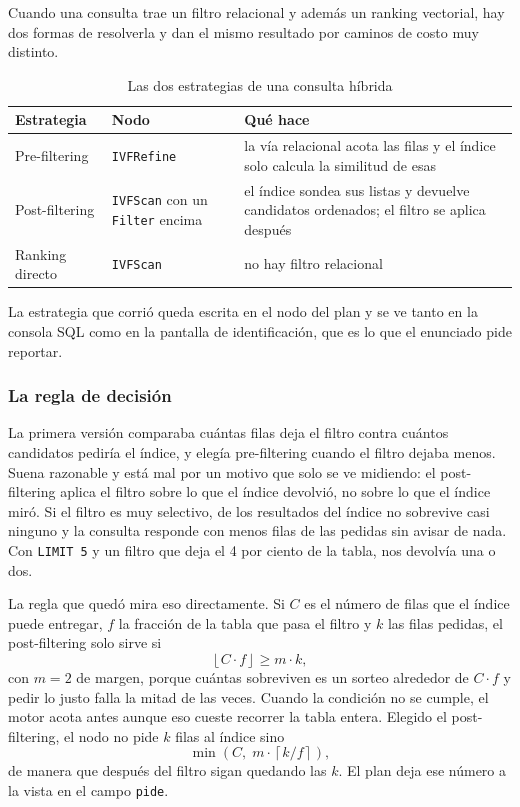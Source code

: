 Cuando una consulta trae un filtro relacional y además un ranking vectorial, hay
dos formas de resolverla y dan el mismo resultado por caminos de costo muy
distinto.

\begin{table}[H]
\centering
\caption{Las dos estrategias de una consulta híbrida}
\begin{tabularx}{\textwidth}{@{}llX@{}}
\toprule
\textbf{Estrategia} & \textbf{Nodo} & \textbf{Qué hace} \\
\midrule
Pre-filtering & \texttt{IVFRefine} & la vía relacional acota las filas y el índice
solo calcula la similitud de esas \\
Post-filtering & \texttt{IVFScan} con un \texttt{Filter} encima & el índice sondea
sus listas y devuelve candidatos ordenados; el filtro se aplica después \\
Ranking directo & \texttt{IVFScan} & no hay filtro relacional \\
\bottomrule
\end{tabularx}
\end{table}

La estrategia que corrió queda escrita en el nodo del plan y se ve tanto en la
consola SQL como en la pantalla de identificación, que es lo que el enunciado
pide reportar.

\subsubsection{La regla de decisión}

La primera versión comparaba cuántas filas deja el filtro contra cuántos
candidatos pediría el índice, y elegía pre-filtering cuando el filtro dejaba
menos. Suena razonable y está mal por un motivo que solo se ve midiendo: el
post-filtering aplica el filtro sobre lo que el índice devolvió, no sobre lo que
el índice miró. Si el filtro es muy selectivo, de los resultados del índice no
sobrevive casi ninguno y la consulta responde con menos filas de las pedidas sin
avisar de nada. Con \texttt{LIMIT 5} y un filtro que deja el 4 por ciento de la
tabla, nos devolvía una o dos.

La regla que quedó mira eso directamente. Si $C$ es el número de filas que el
índice puede entregar, $f$ la fracción de la tabla que pasa el filtro y $k$ las
filas pedidas, el post-filtering solo sirve si
\begin{equation}
    \left\lfloor C \cdot f \right\rfloor \ge m \cdot k ,
\end{equation}
con $m = 2$ de margen, porque cuántas sobreviven es un sorteo alrededor de
$C \cdot f$ y pedir lo justo falla la mitad de las veces. Cuando la condición no
se cumple, el motor acota antes aunque eso cueste recorrer la tabla entera.
Elegido el post-filtering, el nodo no pide $k$ filas al índice sino
\begin{equation}
    \min\left(C,\; m \cdot \left\lceil k / f \right\rceil\right),
\end{equation}
de manera que después del filtro sigan quedando las $k$. El plan deja ese número
a la vista en el campo \texttt{pide}.

